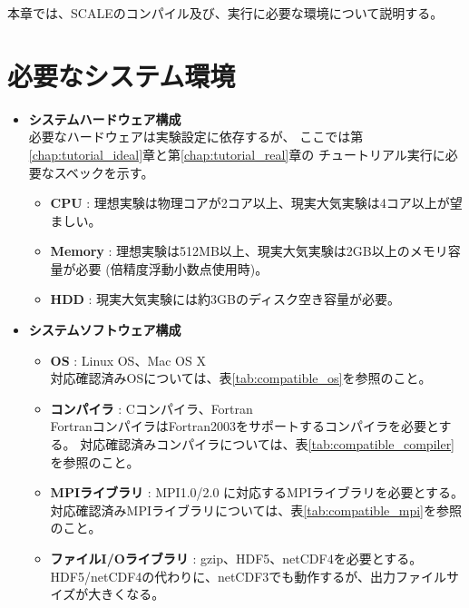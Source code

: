 
本章では、SCALEのコンパイル及び、実行に必要な環境について説明する。

\section{必要なシステム環境} \label{sec:req_env}

\begin{itemize}
  \item {\bf システムハードウェア構成}\\
必要なハードウェアは実験設定に依存するが、
ここでは第\ref{chap:tutorial_ideal}章と第\ref{chap:tutorial_real}章の
チュートリアル実行に必要なスベックを示す。
  \begin{itemize}
    \item {\bf CPU} : 理想実験は物理コアが2コア以上、現実大気実験は4コア以上が望ましい。
    \item {\bf Memory} : 理想実験は512MB以上、現実大気実験は2GB以上のメモリ容量が必要 (倍精度浮動小数点使用時)。
    \item {\bf HDD} : 現実大気実験には約3GBのディスク空き容量が必要。
  \end{itemize}

  \item {\bf システムソフトウェア構成}
  \begin{itemize}
  \item {\bf OS} : Linux OS、Mac OS X\\
        対応確認済みOSについては、表\ref{tab:compatible_os}を参照のこと。
  \item {\bf コンパイラ} : Cコンパイラ、Fortran\\
        FortranコンパイラはFortran2003をサポートするコンパイラを必要とする。
        対応確認済みコンパイラについては、表\ref{tab:compatible_compiler}を参照のこと。
  \item {\bf MPIライブラリ} : MPI1.0/2.0 に対応するMPIライブラリを必要とする。
        対応確認済みMPIライブラリについては、表\ref{tab:compatible_mpi}を参照のこと。
  \item {\bf ファイルI/Oライブラリ} : gzip、HDF5、netCDF4を必要とする。\\
        HDF5/netCDF4の代わりに、netCDF3でも動作するが、出力ファイルサイズが大きくなる。
  \end{itemize}
\end{itemize}


